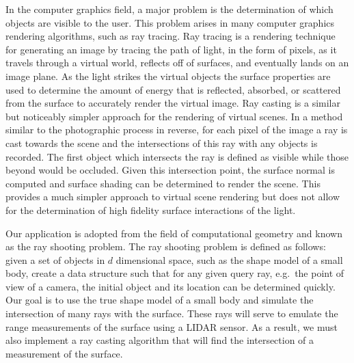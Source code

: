 \documentclass[letterpaper, paper,11pt]{AAS}		%
\begin{document}
In the computer graphics field, a major problem is the determination of which objects are visible to the user.
This problem arises in many computer graphics rendering algorithms, such as ray tracing.
Ray tracing is a rendering technique for generating an image by tracing the path of light, in the form of pixels, as it travels through a virtual world, reflects off of surfaces, and eventually lands on an image plane.
As the light strikes the virtual objects the surface properties are used to determine the amount of energy that is reflected, absorbed, or scattered from the surface to accurately render the virtual image. 
Ray casting is a similar but noticeably simpler approach for the rendering of virtual scenes.
In a method similar to the photographic process in reverse, for each pixel of the image a ray is cast towards the scene and the intersections of this ray with any objects is recorded.
The first object which intersects the ray is defined as visible while those beyond would be occluded.
Given this intersection point, the surface normal is computed and surface shading can be determined to render the scene.
This provides a much simpler approach to virtual scene rendering but does not allow for the determination of high fidelity surface interactions of the light.

Our application is adopted from the field of computational geometry and known as the ray shooting problem.
The ray shooting problem is defined as follows: given a set of objects in \( d \) dimensional space, such as the shape model of a small body, create a data structure such that for any given query ray, e.g.\ the point of view of a camera, the initial object and its location can be determined quickly.
Our goal is to use the true shape model of a small body and simulate the intersection of many rays with the surface.
These rays will serve to emulate the range measurements of the surface using a LIDAR sensor.
As a result, we must also implement a ray casting algorithm that will find the intersection of a measurement of the surface. 
\end{document}
